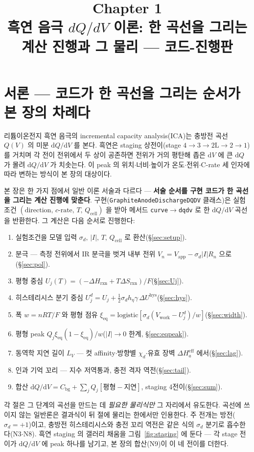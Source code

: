 \documentclass[11pt,a4paper]{article}
\title{\textbf{\LARGE Chapter 1}\\[0.35em]\Large 흑연 음극 $dQ/dV$ 이론: 한 곡선을 그리는 계산 진행과 그 물리 — 코드-진행판}
\author{}
\date{}
\newcommand{\dd}{\mathrm{d}}
\newcommand{\eff}{\mathrm{eff}}
\newcommand{\eq}{\mathrm{eq}}
\newcommand{\app}{\mathrm{app}}
\newcommand{\cell}{\mathrm{cell}}
\newcommand{\bg}{\mathrm{bg}}
\newcommand{\work}{\mathrm{work}}
\newcommand{\hys}{\mathrm{hys}}
\newcommand{\sgn}{\sigma_d}
\begin{document}
\maketitle

\section*{서론 — 코드가 한 곡선을 그리는 순서가 본 장의 차례다}
리튬이온전지 흑연 음극의 incremental capacity analysis(ICA)는 충방전 곡선 $Q(V)$ 의 미분 $\dd Q/\dd V$ 를 본다. 흑연은 staging 상전이(stage $4\!\to\!3\!\to\!2\mathrm L\!\to\!2\!\to\!1$)를 거치며 각 전이 전위에서 두 상이 공존하면 전위가 거의 평탄해 좁은 $\dd V$ 에 큰 $\dd Q$ 가 몰려 $\dd Q/\dd V$ 가 치솟는다. 이 peak 의 위치$\cdot$너비$\cdot$높이가 온도$\cdot$전위$\cdot$C-rate 세 인자에 따라 변하는 방식이 본 장의 대상이다.

본 장은 한 가지 점에서 일반 이론 서술과 다르다 — \textbf{서술 순서를 구현 코드가 한 곡선을 그리는 계산 진행에 맞춘다}. 구현(\texttt{GraphiteAnodeDischargeDQDV} 클래스)은 실험조건 $(\text{direction},\,c\text{-rate},\,T,\,Q_\cell)$ 을 받아 메서드 \texttt{curve}$\to$\texttt{dqdv} 로 한 $\dd Q/\dd V$ 곡선을 반환한다. 그 계산은 다음 순서로 진행한다:
\begin{enumerate}[label=\textbf{N\arabic*.},start=0,leftmargin=2.6em,itemsep=1pt]
\item 실험조건을 모델 입력 $\sgn,\,|I|,\,T,\,Q_\cell$ 로 환산(\S\ref{sec:setup}).
\item 분극 — 측정 전위에서 IR 분극을 벗겨 내부 전위 $V_n=V_\app-\sgn|I|R_n$ 으로(\S\ref{sec:pol}).
\item 평형 중심 $U_j(T)=(-\Delta H_{\mathrm{rxn}}+T\Delta S_{\mathrm{rxn}})/F$(\S\ref{sec:Uj}).
\item 히스테리시스 분기 중심 $U_j^d=U_j+\tfrac12\sgn h_\eta\gamma\,\Delta U^\hys$(\S\ref{sec:hys}).
\item 폭 $w=nRT/F$ 와 평형 점유 $\xi_\eq=\mathrm{logistic}[\sgn(V_\work-U_j^d)/w]$(\S\ref{sec:width}).
\item 평형 peak $Q_j\xi_\eq(1-\xi_\eq)/w$($|I|\to0$ 한계, \S\ref{sec:eqpeak}).
\item 동역학 지연 길이 $L_V$ — 컷 affinity$\cdot$방향별 $\chi_d$$\cdot$유효 장벽 $\Delta H_a^\eff$ 에서(\S\ref{sec:lag}).
\item 인과 기억 꼬리 — 지수 저역통과, 충전 격자 역전(\S\ref{sec:tail}).
\item 합산 $\dd Q/\dd V=C_\bg+\sum_jQ_j[\text{평형}-\text{지연}]$, staging 4전이(\S\ref{sec:sum}).
\end{enumerate}
각 절은 그 단계의 곡선을 만드는 데 \emph{필요한 물리식만} 그 자리에서 유도한다. 곡선에 쓰이지 않는 일반론은 결과식이 뒤 절에 물리는 한에서만 인용한다. 주 전개는 방전($\sgn=+1$)이고, 충방전 히스테리시스와 충전 꼬리 역전은 같은 식의 $\sgn$ 분기로 흡수한다(N3$\cdot$N8). 흑연 staging 의 갤러리 채움을 그림~\ref{fig:staging} 에 둔다 — 각 stage 전이가 $\dd Q/\dd V$ 에 peak 하나를 남기고, 본 장의 합산(N9)이 이 네 전이를 더한다.
\end{document}
